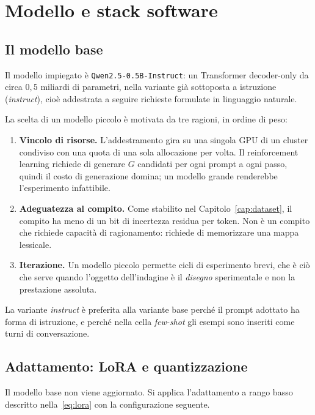 \chapter{Modello e stack software}
\label{cap:modello}

\section{Il modello base}

Il modello impiegato è \texttt{Qwen2.5-0.5B-Instruct}: un Transformer
decoder-only da circa $0{,}5$ miliardi di parametri, nella variante già
sottoposta a istruzione (\emph{instruct}), cioè addestrata a seguire richieste
formulate in linguaggio naturale.

La scelta di un modello piccolo è motivata da tre ragioni, in ordine di peso:

\begin{enumerate}
  \item \textbf{Vincolo di risorse.} L'addestramento gira su una singola GPU di
        un cluster condiviso con una quota di una sola allocazione per volta. Il
        reinforcement learning richiede
        di generare $G$ candidati per ogni prompt a ogni passo, quindi il costo
        di generazione domina; un modello grande renderebbe l'esperimento
        infattibile.
  \item \textbf{Adeguatezza al compito.} Come stabilito nel
        Capitolo~\ref{cap:dataset}, il compito ha meno di un bit di incertezza
        residua per token. Non è un compito che richiede capacità di
        ragionamento: richiede di memorizzare una mappa lessicale.
  \item \textbf{Iterazione.} Un modello piccolo permette cicli di esperimento
        brevi, che è ciò che serve quando l'oggetto dell'indagine è il
        \emph{disegno} sperimentale e non la prestazione assoluta.
\end{enumerate}

La variante \emph{instruct} è preferita alla variante base perché il prompt
adottato ha forma di istruzione, e perché nella cella \emph{few-shot} gli esempi
sono inseriti come turni di conversazione.

\section{Adattamento: LoRA e quantizzazione}

Il modello base non viene aggiornato. Si applica l'adattamento a rango basso
descritto nella~\eqref{eq:lora} con la configurazione seguente.

